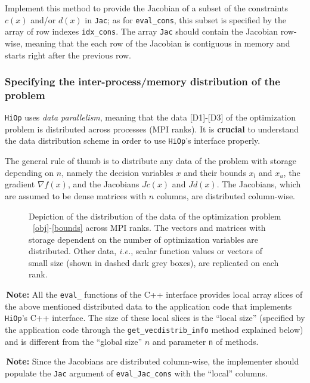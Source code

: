 \documentclass[11pt]{article}
\newcommand{\warningSymbol}{\raisebox{0.9\depth}{\danger}}
\newcommand{\warningcp}[1]{%
        \smallskip \noindent \textcolor{warningColorText}{\warningSymbol{}}\,\textbf{#1} %
    }
\newcommand{\Hi}{\texttt{HiOp}\xspace}
\begin{document}
\noindent Implement this method to provide the Jacobian of a subset of the  constraints $c(x)$ and/or $d(x)$ in \texttt{Jac}; as for \texttt{eval\_cons}, this subset is specified by the array of row indexes \texttt{idx\_cons}. The array \texttt{Jac} should contain the Jacobian row-wise, meaning that the each row of the Jacobian is contiguous in memory and starts right after the previous row.


\subsubsection{Specifying the inter-process/memory distribution of the   problem}

\Hi uses \textit{data parallelism}, meaning that the data [D1]-[D3] of the optimization problem is distributed across processes (MPI ranks). It is \textbf{crucial} to understand the data distribution scheme in order to use \Hi's interface properly. 

The general rule of thumb is to distribute any data of the problem with storage depending on $n$, namely the decision variables $x$ and their bounds $x_l$ and $x_u$, the gradient $\nabla f(x)$, and the Jacobians $Jc(x)$ and $Jd(x)$. The Jacobians, which are assumed to be dense matrices with $n$ columns, are distributed column-wise.

\begin{figure}[h]
\centering

\caption{Depiction of the distribution of the data of the optimization problem ~\eqref{obj}-\eqref{bounds} across MPI ranks. The vectors and matrices with storage dependent on the number of optimization variables are distributed. Other data, \textit{i.e.}, scalar function values or vectors of small size (shown in dashed dark grey boxes), are replicated on each rank.}
\label{diagr_distrib}
\end{figure}
%

\warningcp{Note:} All the \texttt{eval\_} functions of the C++ interface provides local array slices of the above mentioned distributed data to the application code that implements \Hi's C++ interface. The size of these local slices is the ``local size'' (specified by the application code through the \texttt{get\_vecdistrib\_info} method explained below) and is different from the ``global size'' $n$ and parameter \texttt{n} of methods. 

\warningcp{Note:} Since the Jacobians are distributed column-wise, the implementer should populate the \texttt{Jac} argument of \texttt{eval\_Jac\_cons} with the ``local'' columns.
\end{document}
